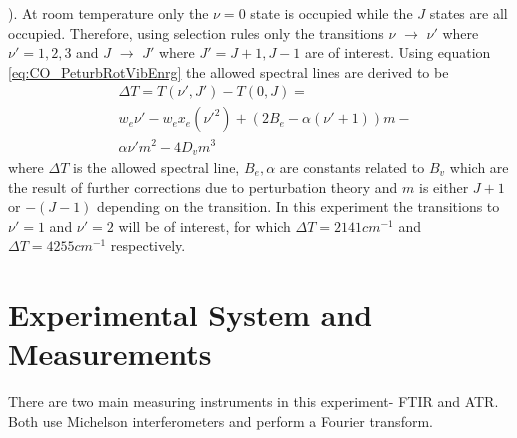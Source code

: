 \documentclass[reprint,amsmath,amssymb,aps, prl,superscriptaddress]{revtex4-2}
\begin{document}
). At room temperature only the $\nu=0$ state is occupied while the $J$ states are all occupied. Therefore, using selection rules \cite{griffithsQM} only the transitions $\nu$ $\rightarrow $ $\nu'$  where $\nu ' =1,2,3$  and $J$ $\rightarrow $ $J'$ where $J'=J+1,J-1$   are of interest. Using equation \ref{eq:CO_PeturbRotVibEnrg}
the allowed spectral lines are derived to be
\begin{equation} \label{eq:CO_DiffPeturbEnrg}
\begin{split}
& \Delta T =T(\nu ',J')-T(0,J)=\\
& w_{e}\nu' -w_{e}x_{e}(\nu'^{2})+(2B_{e}-\alpha(\nu'+1))m-\\
& \alpha\nu'm^2-4D_{v}m^{3}
\end{split}
\end{equation}
where $\Delta T$ is the allowed spectral line, $B_{e},\alpha $ are constants related to $B_{v}$  which are the result of further corrections due to perturbation theory and $m$ is either $J+1$ or $-(J-1)$  depending on the transition. In this experiment the transitions to $\nu'=1$ and $\nu' =2$ will be of interest, for which $\Delta T=2141cm^{-1}$ and $\Delta T = 4255 cm^{-1}$ respectively.


\section{Experimental System and Measurements}
There are two main measuring instruments in this experiment- FTIR and ATR. Both use Michelson interferometers and perform a Fourier transform.
\end{document}

